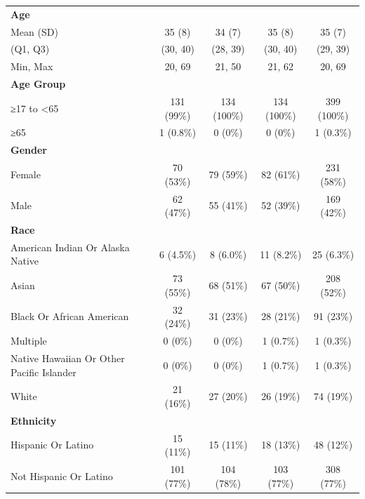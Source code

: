 \documentclass[
  12pt,
  letterpaper,
  DIV=11,
  numbers=noendperiod]{scrartcl}
\begin{document}
\begin{longtable}[l]{lcccc}
\endfoot
\bottomrule
\endlastfoot
\textbf{Age} &  &  &  & \\
\hspace{1em}Mean (SD) & 35 (8) & 34 (7) & 35 (8) & 35 (7)\\
\hspace{1em}(Q1, Q3) & (30, 40) & (28, 39) & (30, 40) & (29, 39)\\
\hspace{1em}Min, Max & 20, 69 & 21, 50 & 21, 62 & 20, 69\\
\textbf{Age Group} &  &  &  & \\
\hspace{1em}≥17 to <65 & 131 (99\%) & 134 (100\%) & 134 (100\%) & 399 (100\%)\\
\hspace{1em}≥65 & 1 (0.8\%) & 0 (0\%) & 0 (0\%) & 1 (0.3\%)\\
\textbf{Gender} &  &  &  & \\
\hspace{1em}Female & 70 (53\%) & 79 (59\%) & 82 (61\%) & 231 (58\%)\\
\hspace{1em}Male & 62 (47\%) & 55 (41\%) & 52 (39\%) & 169 (42\%)\\
\textbf{Race} &  &  &  & \\
\hspace{1em}American Indian Or Alaska Native & 6 (4.5\%) & 8 (6.0\%) & 11 (8.2\%) & 25 (6.3\%)\\
\hspace{1em}Asian & 73 (55\%) & 68 (51\%) & 67 (50\%) & 208 (52\%)\\
\hspace{1em}Black Or African American & 32 (24\%) & 31 (23\%) & 28 (21\%) & 91 (23\%)\\
\hspace{1em}Multiple & 0 (0\%) & 0 (0\%) & 1 (0.7\%) & 1 (0.3\%)\\
\hspace{1em}Native Hawaiian Or Other Pacific Islander & 0 (0\%) & 0 (0\%) & 1 (0.7\%) & 1 (0.3\%)\\
\hspace{1em}White & 21 (16\%) & 27 (20\%) & 26 (19\%) & 74 (19\%)\\
\textbf{Ethnicity} &  &  &  & \\
\hspace{1em}Hispanic Or Latino & 15 (11\%) & 15 (11\%) & 18 (13\%) & 48 (12\%)\\
\hspace{1em}Not Hispanic Or Latino & 101 (77\%) & 104 (78\%) & 103 (77\%) & 308 (77\%)\\

\end{longtable}
\end{document}
